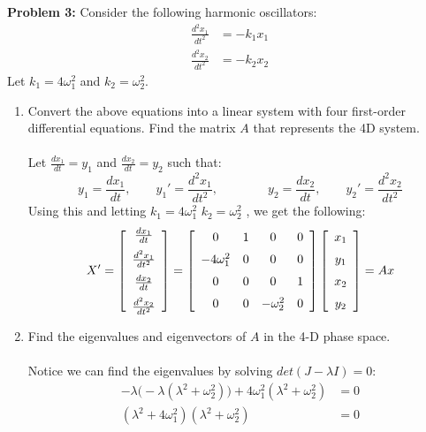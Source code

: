 \documentclass[11pt]{article}
\newcommand{\spacer}{\noalign{\medskip}}
\newenvironment{problem}[1]{\textbf{Problem #1: }}{\newpage}
\begin{document}
	\begin{problem}{3}
		Consider the following harmonic oscillators:
		\begin{align*}
			\frac{d^2x_1}{dt^2} &= -k_1x_1 \\
			\frac{d^2x_2}{dt^2} &= -k_2x_2
		\end{align*}
		Let $k_1 = 4\omega_1^2$ and $k_2 = \omega_2^2$.
		\begin{enumerate}[label = (\alph*)]
			\item Convert the above equations into a linear system with four first-order
			differential equations. Find the matrix $A$ that represents the 4D system.
			\\ \\
			Let $\frac{dx_1}{dt} = y_1$ and $\frac{dx_2}{dt} = y_2$ such that:
			\[y_1 = \frac{dx_1}{dt}, \qquad y_1' = \frac{d^2x_1}{dt^2}, \qquad \qquad y_2 = \frac{dx_2}{dt}, \qquad y_2' = \frac{d^2x_2}{dt^2}\]
			Using this and letting $k_1 = 4\omega_1^2$  $k_2 = \omega_2^2$ , we get the following:
			\[X' = \left[\begin{array}{c}
				\frac{dx_1}{dt} \\ \spacer \frac{d^2x_1}{dt^2} \\ \spacer \frac{dx_2}{dt} \\ \spacer \frac{d^2x_2}{dt^2}
			\end{array}\right] = \left[\begin{array}{cccc}
				0 & 1 & 0 & 0 \\
				\spacer -4\omega_1^2 & 0 & 0 & 0 \\
				\spacer 0 & 0 & 0 & 1 \\
				\spacer 0 & 0 & -\omega_2^2 & 0
			\end{array}\right]\left[\begin{array}{c}
				x_1 \\ \spacer y_1 \\ \spacer x_2 \\ \spacer y_2
			\end{array}\right] = Ax\]
			\item Find the eigenvalues and eigenvectors of $A$ in the 4-D phase space.
			\\ \\
			Notice we can find the eigenvalues by solving $det(J - \lambda I) = 0$:
			\begin{align*}
				-\lambda\bigg(-\lambda(\lambda^2 + \omega_2^2)\bigg) + 4\omega_1^2(\lambda^2 + \omega_2^2) &= 0 \\
				(\lambda^2 + 4\omega_1^2)(\lambda^2 + \omega_2^2) &= 0

\end{align*}
\end{enumerate}
\end{problem}
\end{document}
